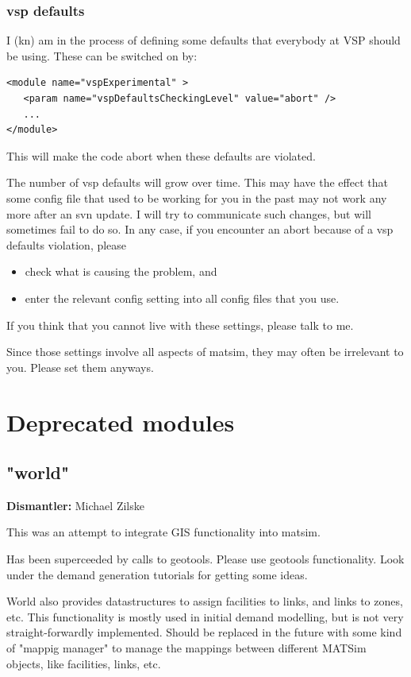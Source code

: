\subsubsection{vsp defaults}

I (kn) am in the process of defining some defaults that everybody at VSP should be using. These can be switched on by:
\begin{verbatim}
<module name="vspExperimental" >
   <param name="vspDefaultsCheckingLevel" value="abort" />
   ...
</module>

\end{verbatim}

This will make the code abort when these defaults are violated.

The number of vsp defaults will grow over time. This may have  the effect that some config file that used to be working for you in the  past may not work any more after an svn update. I will try to  communicate such changes, but will sometimes fail to do so. In any  case, if you encounter an abort because of a vsp defaults violation,  please
\begin{itemize}
	\item check what is causing the problem, and
	\item enter the relevant config setting into all config files that you use.
\end{itemize}

If you think that you cannot live with these settings, please talk to me.

Since those settings involve all aspects of matsim, they may often be irrelevant to you. Please set them anyways.

\vfill\eject
\section{Deprecated modules}

\subsection{"world"}

\textbf{Dismantler:} Michael Zilske

This was an attempt to integrate GIS functionality into matsim.

Has been superceeded by calls to geotools. Please use geotools  functionality. Look under the demand generation tutorials for  getting some ideas.

World also provides datastructures to assign facilities to links, and  links to zones, etc. This functionality is mostly used in initial  demand modelling, but is not very straight-forwardly implemented. Should  be replaced in the future with some kind of "mappig manager" to manage  the mappings between different MATSim objects, like facilities, links,  etc.

